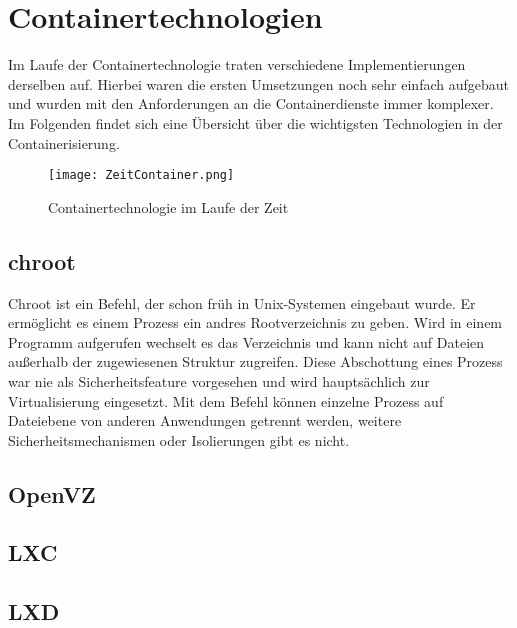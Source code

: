 \section{Containertechnologien} 
\label{sec:Containertechnologien}

Im Laufe der  Containertechnologie traten verschiedene Implementierungen derselben auf. Hierbei waren die ersten Umsetzungen noch sehr einfach aufgebaut und wurden mit den Anforderungen an die Containerdienste immer komplexer. Im Folgenden findet sich eine Übersicht über die wichtigsten Technologien in der Containerisierung.

\begin{figure}[H]
	\begin{center}
		\texttt{[image: ZeitContainer.png]}
	\end{center}
	\caption[Containertechnologie im Laufe der Zeit]{Containertechnologie im Laufe der Zeit}
	\label{fig:CTZeit}
\end{figure}


\subsection{chroot}
\label{sec:chroot}

Chroot ist ein Befehl, der schon früh in Unix-Systemen eingebaut wurde. Er ermöglicht es einem Prozess ein andres Rootverzeichnis zu geben. Wird in einem Programm  aufgerufen wechselt es das Verzeichnis und kann nicht auf Dateien außerhalb der zugewiesenen Struktur zugreifen. Diese Abschottung eines Prozess war nie als Sicherheitsfeature vorgesehen und wird hauptsächlich zur Virtualisierung eingesetzt. Mit dem Befehl können einzelne Prozess auf Dateiebene von anderen Anwendungen getrennt werden, weitere Sicherheitsmechanismen oder Isolierungen gibt es nicht.\cite{IEEE7830207,569694, MANPAGE01}

\subsection{OpenVZ}
\label{sec:OpenVZ}


\subsection{LXC}
\label{sec:lxc}



\subsection{LXD}
\label{sec:lxd}


